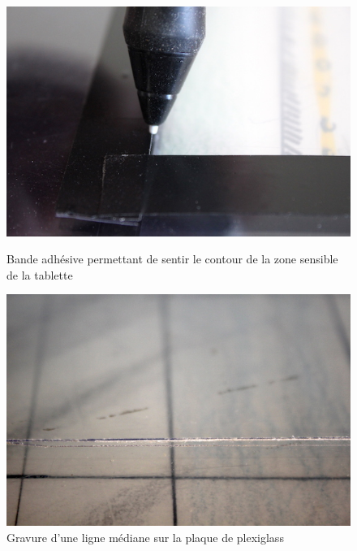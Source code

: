\begin{figure}[!htbp]
	\captionsetup{format=plain}%
	\centering
	\begin{minipage}[t]{0.48\textwidth}
		\includegraphics[width=\linewidth]{gfx/05_interfaces/filigramophone-adhesif_72dpi.jpg}
		\caption{Bande adhésive permettant de sentir le contour de la zone sensible de la tablette}
		\label{fig:interface:filigramophone-adhesif}
	\end{minipage}
	\hspace{.02\linewidth}
	\begin{minipage}[t]{0.48\textwidth}
	    \includegraphics[width=\linewidth]{gfx/05_interfaces/Filigramophone_gravure_72dpi.jpg}
		\caption{Gravure d'une ligne médiane sur la plaque de plexiglass}
		\label{fig:interface:filigramophone-plexigravure}
	\end{minipage}
\end{figure}

